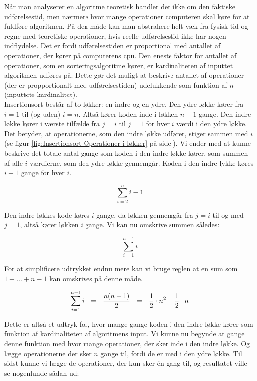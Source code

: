 Når man analyserer en algoritme teoretisk handler det ikke om den faktiske udførelsestid, men nærmere hvor mange operationer computeren skal køre for at fuldføre algoritmen. På den måde kan man abstrahere helt væk fra fysisk tid og regne med teoretiske operationer, hvis reelle udførelsestid ikke har nogen indflydelse. Det er fordi udførelsestiden er proportional med antallet af operationer, der kører på computerens cpu. Den eneste faktor for antallet af operationer, som en sorteringsalgoritme kører, er kardinaliteten af inputtet algoritmen udføres på. Dette gør det muligt at beskrive antallet af operationer (der er propportionalt med udførelsestiden) udelukkende som funktion af $n$ (inputtets kardinalitet). \cite[s. 42]{aogd}\\


Insertionsort består af to løkker: en indre og en ydre. Den ydre løkke kører fra $i = 1$ til (og uden) $i = n$. Altså kører koden inde i løkken $n - 1$ gange. Den indre løkke kører i værste tilfælde fra $j = i$ til $j = 1$ for hver $i$ værdi i den ydre løkke. Det betyder, at operationerne, som den indre løkke udfører, stiger sammen med $i$ (se figur \ref{fig:Insertionsort Operationer i løkker} på side \pageref{fig:Insertionsort Operationer i løkker}). Vi ender med at kunne beskrive det totale antal gange som koden i den indre løkke kører, som summen af alle $i$-værdierne, som den ydre løkke gennemgår. Koden i den indre lykke køres $i-1$ gange for hver $i$.

$$\sum_{i=2}^{n}i-1$$

Den indre løkkes kode køres $i$ gange, da løkken gennemgår fra $j=i$ til og med $j=1$, altså kører løkken $i$ gange. Vi kan nu omskrive summen således:

$$\sum_{i=1}^{n-1}i$$

For at simplificere udtrykket endnu mere kan vi bruge reglen at en sum som $1 + \dots + n -1$ kan omskrives på denne måde. 

$$\sum_{i=1}^{n-1}i \:\:\:=\:\:\: \frac{n(n-1)}{2} \:\:\:=\:\:\: \frac{1}{2}\cdot  n^2 - \frac{1}{2}\cdot  n$$

Dette er altså et udtryk for, hvor mange gange koden i den indre løkke kører som funktion af kardinaliteten af algoritmens input. Vi kunne nu begynde at gange denne funktion med hvor mange operationer, der sker inde i den indre løkke. Og lægge operationerne der sker $n$ gange til, fordi de er med i den ydre løkke. Til sidst kunne vi lægge de operationer, der kun sker én gang til, og resultatet ville se nogenlunde sådan ud:

